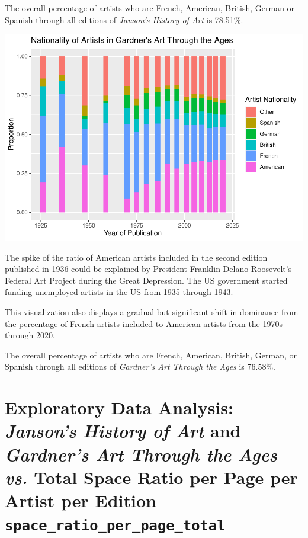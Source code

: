 \documentclass[
  letterpaper,
  DIV=11,
  numbers=noendperiod]{scrreprt}
\begin{document}
The overall percentage of artists who are French, American, British,
German or Spanish through all editions of \emph{Janson's History of Art}
is 78.51\%.

\includegraphics{Chapter1/Chapter1_files/figure-pdf/gardnernationalitythroughtime-1.pdf}

The spike of the ratio of American artists included in the second
edition published in 1936 could be explained by President Franklin
Delano Roosevelt's Federal Art Project during the Great Depression. The
US government started funding unemployed artists in the US from 1935
through 1943.

This visualization also displays a gradual but significant shift in
dominance from the percentage of French artists included to American
artists from the 1970s through 2020.

The overall percentage of artists who are French, American, British,
German, or Spanish through all editions of \emph{Gardner's Art Through
the Ages} is 76.58\%.

\hypertarget{exploratory-data-analysis-jansons-history-of-art-and-gardners-art-through-the-ages-vs.-total-space-ratio-per-page-per-artist-per-edition-space_ratio_per_page_total}{%
\chapter{\texorpdfstring{Exploratory Data Analysis: \emph{Janson's
History of Art} and \emph{Gardner's Art Through the Ages vs.} Total
Space Ratio per Page per Artist per Edition
\texttt{space\_ratio\_per\_page\_total}}{Exploratory Data Analysis: Janson's History of Art and Gardner's Art Through the Ages vs. Total Space Ratio per Page per Artist per Edition space\_ratio\_per\_page\_total}}\label{exploratory-data-analysis-jansons-history-of-art-and-gardners-art-through-the-ages-vs.-total-space-ratio-per-page-per-artist-per-edition-space_ratio_per_page_total}}
\end{document}
